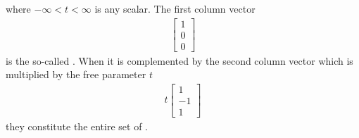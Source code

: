 \begin{solution}
where $-\infty < t < \infty$ is any scalar. The first column vector 
\begin{align*}
\begin{bmatrix}
1 \\
0 \\
0
\end{bmatrix}    
\end{align*}
is the so-called . When it is complemented by the second column vector which is multiplied by the free parameter $t$
\begin{align*}
t
\begin{bmatrix}
1 \\
-1 \\
1
\end{bmatrix}    
\end{align*}
they constitute the entire set of . 
\end{solution}
